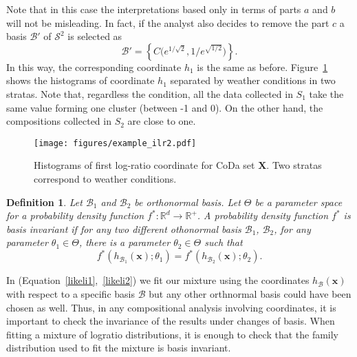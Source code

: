 \documentclass[12pt, a4paper]{article}
\newtheorem{definition}{Definition}
\begin{document}
Note that in this case the interpretations based only in terms of parts $a$ and $b$ will not be misleading. In fact, if the analyst also decides to remove the part $c$ a basis $\mathcal{B}'$ of $\mathcal{S}^2$ is selected as
\[
\mathcal{B}' = \left\{ C\Big( e^{1/\sqrt{2}}, 1/e^{\sqrt{1/2}} \Big) \right\}.
\]
In this way, the corresponding coordinate $h_1$ is the same as before. Figure~\ref{example_ilr2} 
shows the histograms of coordinate $h_1$ separated by weather conditions in two stratas. Note that, regardless the condition, all the data collected in $S_1$ take the same value forming one cluster (between -1 and 0). On the other hand, the compositions collected in $S_2$ are close to one.

\begin{figure}[thbp]
\centering
\texttt{[image: figures/example\_ilr2.pdf]}
\caption{Histograms of first log-ratio coordinate for CoDa set $\mathbf{X}$. Two stratas correspond to weather conditions.}\label{example_ilr2}
\end{figure}
% 

\begin{definition}
Let $\mathcal{B}_1$ and $\mathcal{B}_2$ be orthonormal basis. Let $\Theta$ be a parameter space for a probability density function $f^*: \mathbb{R}^d \rightarrow \mathbb{R}^+$. 
A probability density function $f^*$ is \emph{basis invariant} if for any two different othonormal basis $\mathcal{B}_1$, $\mathcal{B}_2$, for any parameter $\theta_1 \in \Theta$, there is a parameter $\theta_2 \in \Theta$ such that
\[
f^*(h_{\mathcal{B}_1}(\textbf{x}); \theta_1) = f^*(h_{\mathcal{B}_2}(\textbf{x}); \theta_2).
\]
\end{definition}

In (Equation~\ref{likeli1},~\ref{likeli2}) we fit our mixture using the coordinates $h_\mathcal{B}(\textbf{x})$ with respect to a specific basis $\mathcal{B}$ but any other orthnormal basis could have been chosen as well. Thus, in any compositional analysis involving coordinates, it is important to check the invariance of the results under changes of basis. When fitting a mixture of logratio distributions, it is enough to check that the family distribution used to fit the mixture is basis invariant. 
\end{document}
